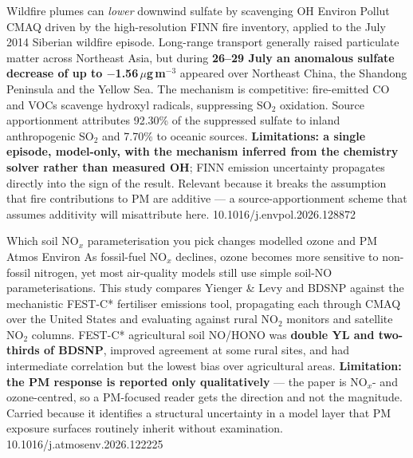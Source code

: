 \documentclass[10pt]{article}
\begin{document}
{Wildfire plumes can \emph{lower} downwind sulfate by scavenging OH}
{Environ Pollut}
{CMAQ driven by the high-resolution FINN fire inventory, applied to the July 2014
Siberian wildfire episode. Long-range transport generally raised particulate matter
across Northeast Asia, but during \textbf{26--29 July an anomalous sulfate decrease of up
to $-$1.56\,$\mu$g\,m$^{-3}$} appeared over Northeast China, the Shandong Peninsula and
the Yellow Sea. The mechanism is competitive: fire-emitted CO and VOCs scavenge hydroxyl
radicals, suppressing SO$_2$ oxidation. Source apportionment attributes 92.30\% of the
suppressed sulfate to inland anthropogenic SO$_2$ and 7.70\% to oceanic sources.
\textbf{Limitations: a single episode, model-only, with the mechanism inferred from the
chemistry solver rather than measured OH}; FINN emission uncertainty propagates directly
into the sign of the result. Relevant because it breaks the assumption that fire
contributions to PM are additive --- a source-apportionment scheme that assumes additivity
will misattribute here.}
{10.1016/j.envpol.2026.128872}

{Which soil NO$_x$ parameterisation you pick changes modelled ozone and PM}
{Atmos Environ}
{As fossil-fuel NO$_x$ declines, ozone becomes more sensitive to non-fossil nitrogen, yet
most air-quality models still use simple soil-NO parameterisations. This study compares
Yienger \& Levy and BDSNP against the mechanistic FEST-C* fertiliser emissions tool,
propagating each through CMAQ over the United States and evaluating against rural NO$_2$
monitors and satellite NO$_2$ columns. FEST-C* agricultural soil NO/HONO was
\textbf{double YL and two-thirds of BDSNP}, improved agreement at some rural sites, and
had intermediate correlation but the lowest bias over agricultural areas.
\textbf{Limitation: the PM response is reported only qualitatively} --- the paper is
NO$_x$- and ozone-centred, so a PM-focused reader gets the direction and not the
magnitude. Carried because it identifies a structural uncertainty in a model layer that
PM exposure surfaces routinely inherit without examination.}
{10.1016/j.atmosenv.2026.122225}
\end{document}
